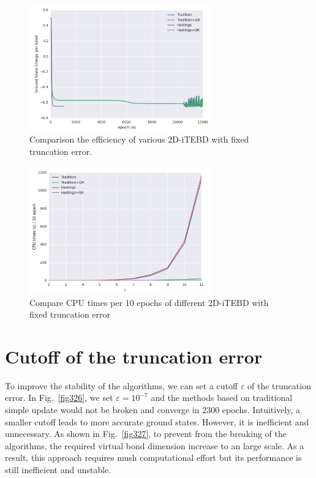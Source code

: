 \begin{figure}[ht]
	\centering
	\includegraphics[width=0.70\textwidth]{figures/fig325.png}
	\caption[Comparison the efficiency of various 2D-iTEBD]{Comparison the efficiency of various 2D-iTEBD with fixed truncation error.}
	\label{fig325}
\end{figure}

\begin{figure}[ht]
	\centering
	\includegraphics[width=0.70\textwidth]{figures/fig324.png}
	\caption[Compare CPU times per 10 epochs of different 2D-iTEBD with fixed trucation error]{Compare CPU times per 10 epochs of different 2D-iTEBD with fixed truncation error}
	\label{fig324}
\end{figure}

\section{Cutoff of the truncation error}

To improve the stability of the algorithms, we can set a cutoff $\varepsilon$ of the truncation error. In Fig.~\ref{fig326}, we set $\varepsilon = 10^{-7}$ and the methods based on traditional simple update would not be broken and converge in 2300 epochs. Intuitively, a smaller cutoff leads to more accurate ground states. However, it is inefficient and unnecessary. As shown in Fig.~\ref{fig327}, to prevent from the breaking of the algorithms, the required virtual bond dimension increase to an large scale. As a result, this approach requires mush computational effort but its performance is still inefficient and unstable. 

